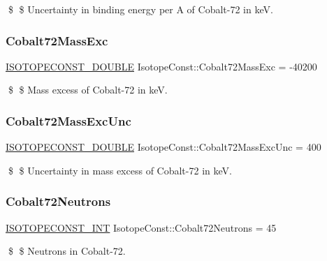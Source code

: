 \$ \$ Uncertainty in binding energy per A of Cobalt-\/72 in keV. \mbox{\label{group___isotope_const-_cobalt-_co72_ga36fce50b2f7bc359e5a0f2c6b4f889be}} 
\subsubsection{\texorpdfstring{Cobalt72\+Mass\+Exc}{Cobalt72MassExc}}
{\footnotesize\ttfamily \mbox{\hyperlink{group___isotope_const-_macros_ga8f45a7272ce02c0b4c65c44636ed719a}{I\+S\+O\+T\+O\+P\+E\+C\+O\+N\+S\+T\+\_\+\+D\+O\+U\+B\+LE}} Isotope\+Const\+::\+Cobalt72\+Mass\+Exc = -\/40200}

\$ \$ Mass excess of Cobalt-\/72 in keV. \mbox{\label{group___isotope_const-_cobalt-_co72_ga4b20baf23585b83d0dd0536390e4e052}} 
\subsubsection{\texorpdfstring{Cobalt72\+Mass\+Exc\+Unc}{Cobalt72MassExcUnc}}
{\footnotesize\ttfamily \mbox{\hyperlink{group___isotope_const-_macros_ga8f45a7272ce02c0b4c65c44636ed719a}{I\+S\+O\+T\+O\+P\+E\+C\+O\+N\+S\+T\+\_\+\+D\+O\+U\+B\+LE}} Isotope\+Const\+::\+Cobalt72\+Mass\+Exc\+Unc = 400}

\$ \$ Uncertainty in mass excess of Cobalt-\/72 in keV. \mbox{\label{group___isotope_const-_cobalt-_co72_ga798fca5c97687314a6dab0c2b3c5f617}} 
\subsubsection{\texorpdfstring{Cobalt72\+Neutrons}{Cobalt72Neutrons}}
{\footnotesize\ttfamily \mbox{\hyperlink{group___isotope_const-_macros_ga5f18360b3e99483a35c32d789e62621c}{I\+S\+O\+T\+O\+P\+E\+C\+O\+N\+S\+T\+\_\+\+I\+NT}} Isotope\+Const\+::\+Cobalt72\+Neutrons = 45}

\$ \$ Neutrons in Cobalt-\/72. \mbox{\label{group___isotope_const-_cobalt-_co72_ga3d5356a6711016233ee565688a096d9d}} 
